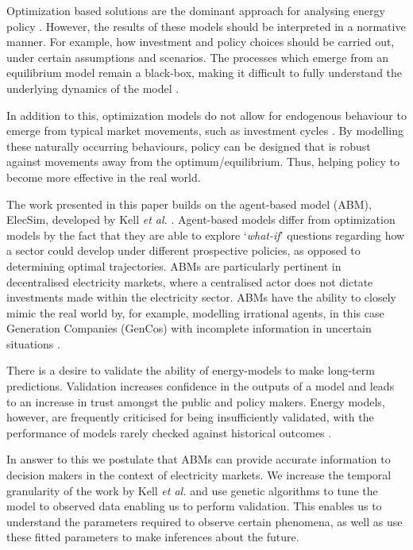 
Optimization based solutions are the dominant approach for analysing energy policy \cite{Chappin2017}. However, the results of these models should be interpreted in a normative manner. For example, how investment and policy choices should be carried out, under certain assumptions and scenarios. The processes which emerge from an equilibrium model remain a black-box, making it difficult to fully understand the underlying dynamics of the model \cite{Chappin2017}. 



In addition to this, optimization models do not allow for  endogenous behaviour to emerge from typical market movements, such as investment cycles \cite{Chappin2017, Gross2007}. By modelling these naturally occurring behaviours, policy can be designed that is robust against movements away from the optimum/equilibrium. Thus, helping policy to become more effective in the real world. 





The work presented in this paper builds on the agent-based model (ABM), ElecSim, developed by Kell \textit{et al.} \cite{Kell}. Agent-based models differ from optimization models by the fact that they are able to explore `\textit{what-if}' questions regarding how a sector could develop under different prospective policies, as opposed to determining optimal trajectories. ABMs are particularly pertinent in decentralised electricity markets, where a centralised actor does not dictate investments made within the electricity sector. ABMs have the ability to closely mimic the real world by, for example, modelling irrational agents, in this case Generation Companies (GenCos) with incomplete information in uncertain situations \cite{Ghorbani2014}. 

There is a desire to validate the ability of energy-models to make long-term predictions. Validation increases confidence in the outputs of a model and leads to an increase in trust amongst the public and policy makers. Energy models, however, are frequently criticised for being insufficiently validated, with the performance of models rarely checked against historical outcomes \cite{Beckman2011}.

In answer to this we postulate that ABMs can provide accurate information to decision makers in the context of electricity markets. We increase the temporal granularity of the work by Kell \textit{et al.} \cite{Kell} and use genetic algorithms to tune the model to observed data enabling us to perform validation. This enables us to understand the parameters required to observe certain phenomena, as well as use these fitted parameters to make inferences about the future. 


